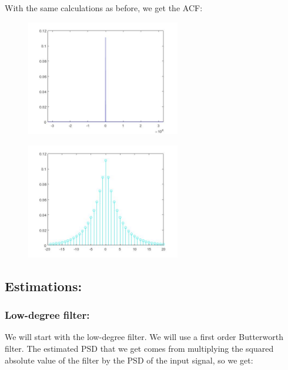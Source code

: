 \documentclass[a4paper,11pt]{article}
\begin{document}
With the same calculations as before, we get the ACF:

\begin{figure}[!hp]
    \begin{center}
    \includegraphics[width=0.6\textwidth]{images/lab2_figure1.jpg}
    \end{center}
\end{figure}

\newpage

\begin{figure}[!hp]
    \begin{center}
    \includegraphics[width=0.6\textwidth]{images/lab2_figure2.jpg}
    \end{center}
\end{figure}

\newpage

\subsection{Estimations:}

\subsubsection{Low-degree filter:}

We will start with the low-degree filter. We will use a first order Butterworth filter. The estimated PSD that we get comes from multiplying the squared absolute value of the filter by the PSD of the input signal, so we get:
\end{document}

